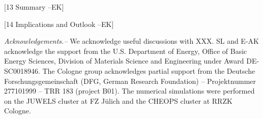 \documentclass[amsmath,amssymb, aps, prx, longbibliography, twocolumn]{revtex4-1}
\begin{document}
[13 Summary --EK]

[14 Implications and Outlook --EK]



{\it Acknowledgements.--} 
We acknowledge useful discussions with XXX. SL and E-AK acknowledge the support from the U.S. Department of Energy, Office of Basic Energy Sciences, Division of Materials Science and Engineering under Award DE-SC0018946.
The Cologne group acknowledges partial support from the Deutsche Forschungsgemeinschaft (DFG, German Research Foundation) -- Projektnummer 277101999 -- TRR 183 (project B01).
The numerical simulations were performed on the JUWELS cluster at FZ J\"ulich and the CHEOPS cluster at RRZK Cologne.


%

\appendix
\end{document}
